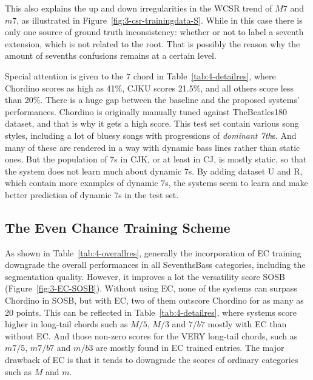 This also explains the up and down irregularities in the WCSR trend of $M7$ and $m7$, as illustrated in Figure~\ref{fig:3-csr-trainingdata-S}. While in this case there is only one source of ground truth inconsistency: whether or not to label a seventh extension, which is not related to the root. That is possibly the reason why the amount of sevenths confusions remains at a certain level.

Special attention is given to the $7$ chord in Table~\ref{tab:4-detailres}, where Chordino scores as high as 41\%, CJKU scores 21.5\%, and all others score less than 20\%. There is a huge gap between the baseline and the proposed systems' performances. Chordino is originally manually tuned against TheBeatles180 dataset, and that is why it gets a high score. This test set contain various song styles, including a lot of bluesy songs with progressions of \textit{dominant 7th}s. And many of these are rendered in a way with dynamic bass lines rather than static ones. But the population of $7$s in CJK, or at least in CJ, is mostly static, so that the system does not learn much about dynamic $7$s. By adding dataset U and R, which contain more examples of dynamic $7$s, the systems seem to learn and make better prediction of dynamic $7$s in the test set.

\subsection{The Even Chance Training Scheme}
As shown in Table~\ref{tab:4-overallres}, generally the incorporation of EC training downgrade the overall performances in all SeventhsBass categories, including the segmentation quality. However, it improves a lot the versatility score SOSB (Figure~\ref{fig:3-EC-SOSB}). Without using EC, none of the systems can surpass Chordino in SOSB, but with EC, two of them outscore Chordino for as many as 20 points. This can be reflected in Table~\ref{tab:4-detailres}, where systems score higher in long-tail chords such as $M/5$, $M/3$ and $7/b7$ mostly with EC than without EC. And those non-zero scores for the VERY long-tail chords, such as $m7/5$, $m7/b7$ and $m/b3$ are mostly found in EC trained entries. The major drawback of EC is that it tends to downgrade the scores of ordinary categories such as $M$ and $m$.

